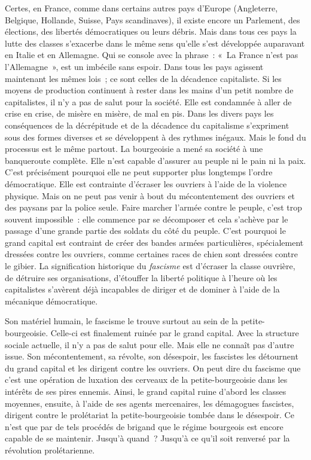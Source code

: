 \documentclass[french,twoside]{book} %
\begin{document}
Certes, en France, comme dans certains autres pays d’Europe (Angleterre, Belgique, Hollande, Suisse, Pays scandinaves), il existe encore un Parlement, des élections, des libertés démocratiques ou leurs débris. Mais dans tous ces pays la lutte des classes s’exacerbe dans le même sens qu’elle s’est développée auparavant en Italie et en Allemagne. Qui se console avec la phrase : « La France n’est pas l’Allemagne », est un imbécile sans espoir. Dans tous les pays agissent maintenant les mêmes lois ; ce sont celles de la décadence capitaliste. Si les moyens de production continuent à rester dans les mains d’un petit nombre de capitalistes, il n’y a pas de salut pour la société. Elle est condamnée à aller de crise en crise, de misère en misère, de mal en pis. Dans les divers pays les conséquences de la décrépitude et de la décadence du capitalisme s’expriment sous des formes diverses et se développent à des rythmes inégaux. Mais le fond du processus est le même partout. La bourgeoisie a mené sa société à une banqueroute complète. Elle n’est capable d’assurer au peuple ni le pain ni la paix. C’est précisément pourquoi elle ne peut supporter plus longtemps l’ordre démocratique. Elle est contrainte d’écraser les ouvriers à l’aide de la violence physique. Mais on ne peut pas venir  à bout du mécontentement des ouvriers et des paysans par la police seule. Faire marcher l’armée contre le peuple, c’est trop souvent impossible : elle commence par se décomposer et cela s’achève par le passage d’une grande partie des soldats du côté du peuple. C’est pourquoi le grand capital est contraint de créer des bandes armées particulières, spécialement dressées contre les ouvriers, comme certaines races de chien sont dressées contre le gibier. La signification historique du \emph{fascisme} est d’écraser la classe ouvrière, de détruire ses organisations, d’étouffer la liberté politique à l’heure où les capitalistes s’avèrent déjà incapables de diriger et de dominer à l’aide de la mécanique démocratique.\par
Son matériel humain, le fascisme le trouve surtout au sein de la petite-bourgeoisie. Celle-ci est finalement ruinée par le grand capital. Avec la structure sociale actuelle, il n’y a pas de salut pour elle. Mais elle ne connaît pas d’autre issue. Son mécontentement, sa révolte, son désespoir, les fascistes les détournent du grand capital et les dirigent contre les ouvriers. On peut dire du fascisme que c’est une opération de luxation des cerveaux de la petite-bourgeoisie dans les intérêts de ses pires ennemis. Ainsi, le grand capital ruine d’abord les classes moyennes, ensuite, à l’aide de ses agents mercenaires, les démagogues fascistes, dirigent contre le prolétariat la petite-bourgeoisie tombée dans le désespoir. Ce n’est que par de tels procédés de brigand que le régime bourgeois est encore capable de se maintenir. Jusqu’à quand ? Jusqu’à ce qu’il soit renversé par la révolution prolétarienne.
\end{document}
